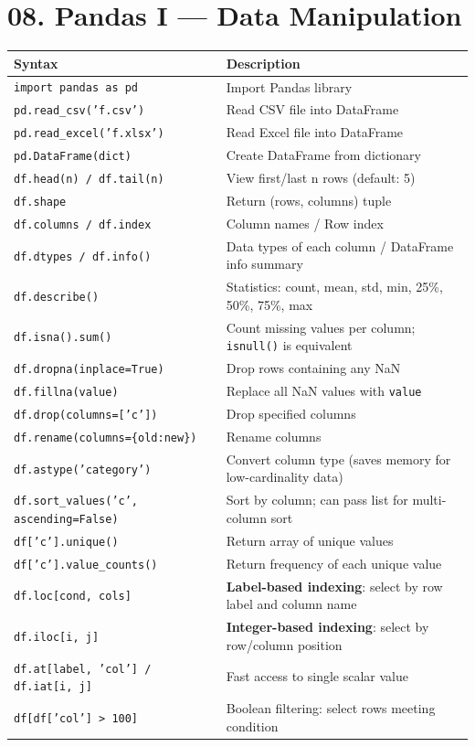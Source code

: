 \documentclass[11pt,a4paper]{report}
\let\oldtexttt\texttt
\renewcommand{\texttt}[1]{\textcolor{mainblue}{\oldtexttt{#1}}}
\begin{document}
\section*{08. Pandas I --- Data Manipulation}
\small\renewcommand{\arraystretch}{1.3}
\centering
\begin{tabularx}{\textwidth}{@{}lX@{}}
\toprule
\textbf{Syntax} & \textbf{Description} \\ \midrule
\texttt{import pandas as pd} & Import Pandas library \\
\texttt{pd.read\_csv('f.csv')} & Read CSV file into DataFrame \\
\texttt{pd.read\_excel('f.xlsx')} & Read Excel file into DataFrame \\
\texttt{pd.DataFrame(dict)} & Create DataFrame from dictionary \\
\texttt{df.head(n) / df.tail(n)} & View first/last n rows (default: 5) \\
\texttt{df.shape} & Return (rows, columns) tuple \\
\texttt{df.columns / df.index} & Column names / Row index \\
\texttt{df.dtypes / df.info()} & Data types of each column / DataFrame info summary \\
\texttt{df.describe()} & Statistics: count, mean, std, min, 25\%, 50\%, 75\%, max \\
\texttt{df.isna().sum()} & Count missing values per column; \texttt{isnull()} is equivalent \\
\texttt{df.dropna(inplace=True)} & Drop rows containing any NaN \\
\texttt{df.fillna(value)} & Replace all NaN values with \texttt{value} \\
\texttt{df.drop(columns=['c'])} & Drop specified columns \\
\texttt{df.rename(columns=\{old:new\})} & Rename columns \\
\texttt{df.astype('category')} & Convert column type (saves memory for low-cardinality data) \\
\texttt{df.sort\_values('c', ascending=False)} & Sort by column; can pass list for multi-column sort \\
\texttt{df['c'].unique()} & Return array of unique values \\
\texttt{df['c'].value\_counts()} & Return frequency of each unique value \\
\texttt{df.loc[cond, cols]} & \textbf{Label-based indexing}: select by row label and column name \\
\texttt{df.iloc[i, j]} & \textbf{Integer-based indexing}: select by row/column position \\
\texttt{df.at[label, 'col'] / df.iat[i, j]} & Fast access to single scalar value \\
\texttt{df[df['col'] > 100]} & Boolean filtering: select rows meeting condition \\
\bottomrule
\end{tabularx}
\normalsize
\end{document}
